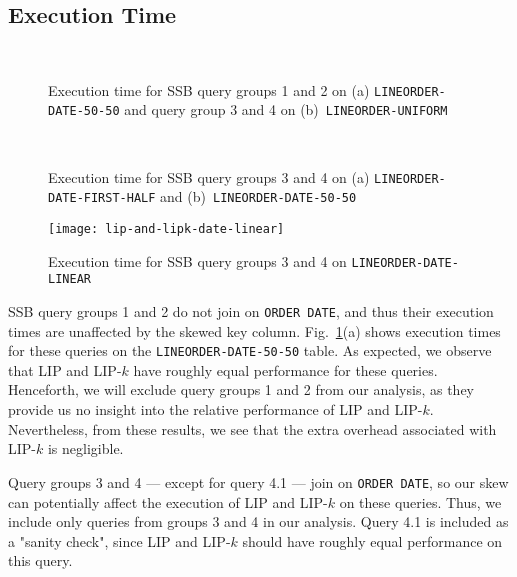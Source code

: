 \subsection{Execution Time}
\label{sec:time}

\begin{figure}
    \centering
    \\
    \caption{Execution time for SSB query groups 1 and 2 on (a) \texttt{LINEORDER-DATE-50-50} and query group 3 and 4 on (b)~\texttt{LINEORDER-UNIFORM}}
    \label{fig:times0}
\end{figure}

\begin{figure}
    \centering
    \\
    \caption{Execution time for SSB query groups 3 and 4 on (a) \texttt{LINEORDER-DATE-FIRST-HALF} and (b)~\texttt{LINEORDER-DATE-50-50}}
    \label{fig:times1}
\end{figure}


\begin{figure}
    \centering    
    \texttt{[image: lip-and-lipk-date-linear]}
    \caption{Execution time for SSB query groups 3 and 4 on \texttt{LINEORDER-DATE-LINEAR}}
    \label{fig:times2}
\end{figure}

SSB query groups 1 and 2 do not join on \texttt{ORDER DATE}, 
and thus their execution times are unaffected by the skewed key column. 
Fig.~\ref{fig:times0}(a) shows execution times for these queries on the \texttt{LINEORDER-DATE-50-50} table.
As expected, we observe that LIP and LIP-$k$ have roughly equal performance for these queries.
Henceforth, we will exclude query groups 1 and 2 from our analysis, 
as they provide us no insight into the relative performance of LIP and LIP-$k$. 
Nevertheless, from these results, we see that the extra overhead associated with LIP-$k$ is negligible.

Query groups 3 and 4 --- except for query 4.1 --- join on \texttt{ORDER DATE}, 
so our skew can potentially affect the execution of LIP and LIP-$k$ on these queries.
Thus, we include only queries from groups 3 and 4 in our analysis. 
Query 4.1 is included as a "sanity check", since LIP and LIP-$k$ should have roughly equal performance on this query.

